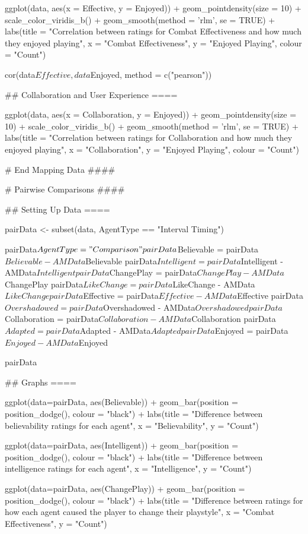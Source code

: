 \documentclass{IEEEtran}
\begin{document}
\begin{verbnobox}[\fontsize{10pt}{10pt}\selectfont]
ggplot(data, aes(x = Effective, y = Enjoyed)) +
  geom_pointdensity(size = 10) +
  scale_color_viridis_b() + 
  geom_smooth(method = 'rlm', se = TRUE) +
  labs(title = "Correlation between ratings for Combat Effectiveness and how much they enjoyed 
  playing",
       x = "Combat Effectiveness", y = "Enjoyed Playing", colour = "Count")

cor(data$Effective, data$Enjoyed, method = c("pearson"))

## Collaboration and User Experience ====

ggplot(data, aes(x = Collaboration, y = Enjoyed)) +
  geom_pointdensity(size = 10) +
  scale_color_viridis_b() + 
  geom_smooth(method = 'rlm', se = TRUE) +
  labs(title = "Correlation between ratings for Collaboration and how much they enjoyed
  playing",
       x = "Collaboration", y = "Enjoyed Playing", colour = "Count")

# End Mapping Data ####

# Pairwise Comparisons ####

## Setting Up Data ====

pairData <- subset(data, AgentType == "Interval Timing")

pairData$AgentType = "Comparison"
pairData$Believable = pairData$Believable - AMData$Believable
pairData$Intelligent = pairData$Intelligent - AMData$Intelligent
pairData$ChangePlay = pairData$ChangePlay - AMData$ChangePlay
pairData$LikeChange = pairData$LikeChange - AMData$LikeChange
pairData$Effective = pairData$Effective - AMData$Effective
pairData$Overshadowed = pairData$Overshadowed - AMData$Overshadowed
pairData$Collaboration = pairData$Collaboration - AMData$Collaboration
pairData$Adapted = pairData$Adapted - AMData$Adapted
pairData$Enjoyed = pairData$Enjoyed - AMData$Enjoyed

pairData

## Graphs ====

ggplot(data=pairData, aes(Believable)) +
  geom_bar(position = position_dodge(), colour = "black") +
  labs(title = "Difference between believability ratings for each agent",
       x = "Believability", y = "Count")

ggplot(data=pairData, aes(Intelligent)) +
  geom_bar(position = position_dodge(), colour = "black") +
  labs(title = "Difference between intelligence ratings for each agent",
       x = "Intelligence", y = "Count")

ggplot(data=pairData, aes(ChangePlay)) +
  geom_bar(position = position_dodge(), colour = "black") +
  labs(title = "Difference between ratings for how each agent caused the player to change their
  playstyle",
       x = "Combat Effectiveness", y = "Count")


\end{verbnobox}
\end{document}
